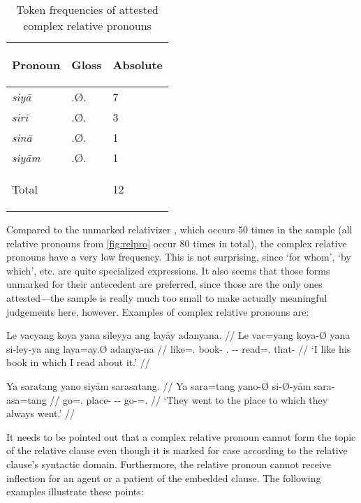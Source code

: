 \begin{table}[tp]\centering
\caption{Token frequencies of attested complex relative pronouns}

\begin{tabu} to .75
\tableheaderfont\toprule

Pronoun & Gloss & Absolute \\

\toprule

siyā	& \Rel{}.Ø.\Loc{} & 7 \\
sirī	& \Rel{}.Ø.\Ins{} & 3 \\
sinā	& \Rel{}.Ø.\Gen{} & 1 \\
siyām	& \Rel{}.Ø.\Dat{} & 1 \\

\bottomrule

\textup{Total}	& & 12 \\

\bottomrule
\end{tabu}
\label{tab:relprotokenfreq}
\end{table}

Compared to the unmarked relativizer , which occurs 50 times in 
the sample (all relative pronouns from \autoref{fig:relpro} occur 80 times in 
total), the complex relative pronouns have a very low frequency. This is not 
surprising, since `for whom', `by which', etc. are quite specialized 
expressions. It also seems that those forms unmarked for their antecedent are 
preferred, since those are the only ones attested---the sample is really much 
too small to make actually meaningful judgements here, however. Examples of 
complex relative pronouns are:

\pex
\a\begingl[glspace=.33em]
	\gla Le vacyang koya yana sileyya ang layāy adanyana. //
	\glb Le vac=yang koya-Ø yana si-ley-ya ang laya=ay.Ø adanya-na //
	\glc \PatTI{} like=\Fsg{}.\Aarg{} book-\Top{} \TsgM{}.\Gen{} 
		\Rel{}-\PargI{}-\Loc{} \Aarg{} read=\Fsg{}.\Top{} that-\Gen{} //
	\glft `I like his book in which I read about it.' //
\endgl

\a\label{ex:reldat}\begingl
	\gla Ya saratang yano siyām sarasatang. //
	\glb Ya sara=tang yano-Ø si-Ø-yām sara-asa=tang //
	\glc \LocT{} go=\TplM{}.\Aarg{} place-\Top{} \Rel{}-\Loc{}-\Dat{} 
		go-\Hab{}=\TplM{}.\Aarg{} //
	\glft `They went to the place to which they always went.' //
\endgl
\xe

It needs to be pointed out that a complex relative pronoun cannot form 
the topic of the relative clause even though it is marked for case according to 
the relative clause's syntactic domain. Furthermore, the relative pronoun cannot 
receive inflection for an agent or a patient of the embedded clause. The 
following examples illustrate these points:

